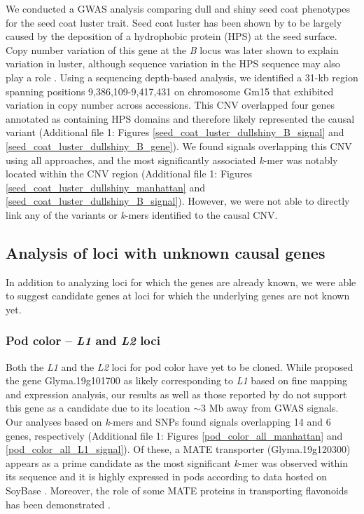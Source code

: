 We conducted a GWAS analysis comparing dull and shiny seed coat phenotypes for
the seed coat luster trait. Seed coat luster has been shown by
\cite{gijzen1999} to be largely caused by the deposition of a hydrophobic
protein (HPS) at the seed surface. Copy number variation of this gene at the
\textit{B} locus was later shown to explain variation in luster, although
sequence variation in the HPS sequence may also play a role \citep{gijzen2006}.
Using a sequencing depth-based analysis, we identified a 31-kb region spanning
positions 9,386,109-9,417,431 on chromosome Gm15 that exhibited variation in
copy number across accessions. This CNV overlapped four genes annotated as
containing HPS domains and therefore likely represented the causal variant
(Additional file 1: Figures \ref{seed_coat_luster_dullshiny_B_signal} and
\ref{seed_coat_luster_dullshiny_B_gene}).  We found signals overlapping this
CNV using all approaches, and the most significantly associated \textit{k}-mer
was notably located within the CNV region (Additional file 1: Figures
\ref{seed_coat_luster_dullshiny_manhattan} and
\ref{seed_coat_luster_dullshiny_B_signal}). However, we were not able to
directly link any of the variants or \textit{k}-mers identified to the causal
CNV.

\subsection*{Analysis of loci with unknown causal genes}
\label{sv-gwas-results}

In addition to analyzing loci for which the genes are already known, we were
able to suggest candidate genes at loci for which the underlying genes are not
known yet. 

\subsubsection*{Pod color -- \textit{L1} and \textit{L2} loci}
\label{sv-gwas-main-results-pod-color-l1-l2}

Both the \textit{L1} and the \textit{L2} loci for pod color have yet to be
cloned. While \cite{he2015} proposed the gene Glyma.19g101700 as likely
corresponding to \textit{L1} based on fine mapping and expression analysis, our
results as well as those reported by \cite{bandillo2017} do not support this
gene as a candidate due to its location $\sim$3 Mb away from GWAS signals. Our
analyses based on \textit{k}-mers and SNPs found signals overlapping 14 and
6 genes, respectively (Additional file 1: Figures \ref{pod_color_all_manhattan} and
\ref{pod_color_all_L1_signal}). Of these, a MATE transporter (Glyma.19g120300)
appears as a prime candidate as the most significant \emph{k}-mer was observed
within its sequence and it is highly expressed in pods according to data hosted
on SoyBase \citep{grant2010, severin2010}. Moreover, the role of some MATE
proteins in transporting flavonoids has been demonstrated \citep{chen2015}.

